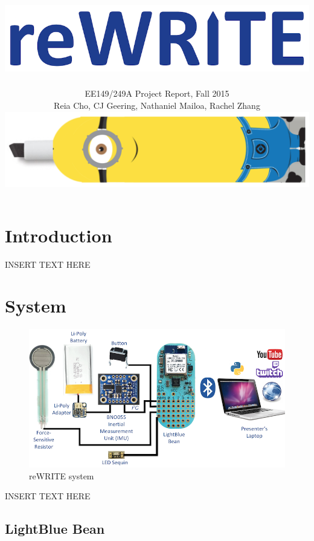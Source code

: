 \documentclass[12pt,journal]{IEEEtran}
\begin{document}
\title{\includegraphics[width=0.4\linewidth]{figures/rewrite}}

\author{EE149/249A Project Report, Fall 2015

Reia Cho, CJ Geering, Nathaniel Mailoa, Rachel Zhang

\includegraphics[width=0.45\linewidth]{figures/minion}}


\maketitle


\section{Introduction}
INSERT TEXT HERE

\section{System}

\begin{figure}[H]
    \includegraphics[width=\linewidth]{figures/system}
  \caption{reWRITE system}
  \label{fig:system}
\end{figure}

INSERT TEXT HERE

\subsection{LightBlue Bean}
\end{document}
